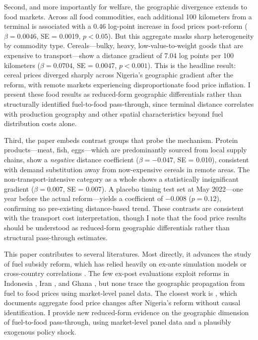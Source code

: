 \documentclass[12pt]{article}
\begin{document}
Second, and more importantly for welfare, the geographic divergence extends to food markets. Across all food commodities, each additional 100 kilometers from a terminal is associated with a 0.46 log-point increase in food prices post-reform ($\beta = 0.0046$, SE = 0.0019, $p < 0.05$). But this aggregate masks sharp heterogeneity by commodity type. Cereals---bulky, heavy, low-value-to-weight goods that are expensive to transport---show a distance gradient of 7.04 log points per 100 kilometers ($\beta = 0.0704$, SE = 0.0047, $p < 0.001$). This is the headline result: cereal prices diverged sharply across Nigeria's geographic gradient after the reform, with remote markets experiencing disproportionate food price inflation. I present these food results as reduced-form geographic differentials rather than structurally identified fuel-to-food pass-through, since terminal distance correlates with production geography and other spatial characteristics beyond fuel distribution costs alone.

Third, the paper embeds contrast groups that probe the mechanism. Protein products---meat, fish, eggs---which are predominantly sourced from local supply chains, show a \textit{negative} distance coefficient ($\beta = -0.047$, SE = 0.010), consistent with demand substitution away from now-expensive cereals in remote areas. The non-transport-intensive category as a whole shows a statistically insignificant gradient ($\beta = 0.007$, SE = 0.007). A placebo timing test set at May 2022---one year before the actual reform---yields a coefficient of $-0.008$ ($p = 0.12$), confirming no pre-existing distance-based trend. These contrasts are consistent with the transport cost interpretation, though I note that the food price results should be understood as reduced-form geographic differentials rather than structural pass-through estimates.

This paper contributes to several literatures. Most directly, it advances the study of fuel subsidy reform, which has relied heavily on ex-ante simulation models \citep{Coady2015,Rentschler2017} or cross-country correlations \citep{Davis2014,Clements2013}. The few ex-post evaluations exploit reforms in Indonesia \citep{Ikhsan2016}, Iran \citep{Guillaume2011}, and Ghana \citep{Ackah2014}, but none trace the geographic propagation from fuel to food prices using market-level panel data. The closest work is \citet{Akinleye2024}, which documents aggregate food price changes after Nigeria's reform without causal identification. I provide new reduced-form evidence on the geographic dimension of fuel-to-food pass-through, using market-level panel data and a plausibly exogenous policy shock.
\end{document}
